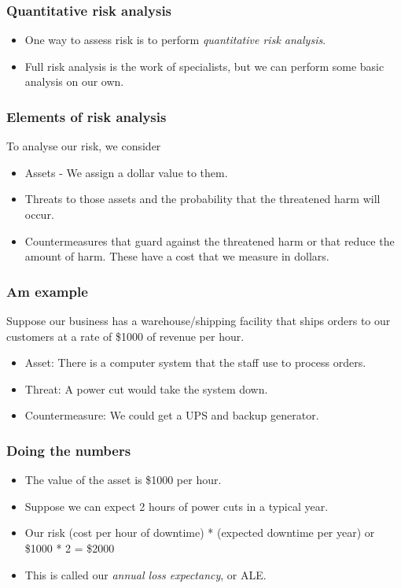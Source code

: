 \documentclass[10pt]{beamer}
\begin{document}
\begin{frame}
	\frametitle{Quantitative risk analysis}

	\begin{itemize}
		\item One way to assess risk is to perform \emph{quantitative risk analysis}.
		\item Full risk analysis is the work of specialists, but we can
			perform some basic analysis on our own.
	\end{itemize}
\end{frame}

\begin{frame}
	\frametitle{Elements of risk analysis}

	To analyse our risk, we consider

	\begin{itemize}
		\item Assets - We assign a dollar value to them.
		\item Threats to those assets and the probability that
			the threatened harm will occur.
		\item Countermeasures that guard against the threatened harm
			or that reduce the amount of harm.  These
			have a cost that we measure in dollars.
	\end{itemize}
\end{frame}

\begin{frame}
	\frametitle{Am example}
	Suppose our business has a warehouse/shipping facility
	that ships orders to our customers at a rate of 
	\$1000 of revenue per hour.

	\begin{itemize}
		\item Asset:  There is a computer system that the staff
			use to process orders.
		\item Threat:  A power cut would take the system down.
		\item Countermeasure:  We could get a UPS and backup generator.
	\end{itemize}
\end{frame}

\begin{frame}
	\frametitle{Doing the numbers}

	\begin{itemize}
		\item The value of the asset is \$1000 per hour.
		\item Suppose we can expect 2 hours of power cuts in a typical year.
		\item Our risk (cost per hour of downtime) * (expected downtime per year)
			or \$1000 * 2 = \$2000
		\item This is called our \emph{annual loss expectancy}, or ALE.

	\end{itemize}
\end{frame}
\end{document}
